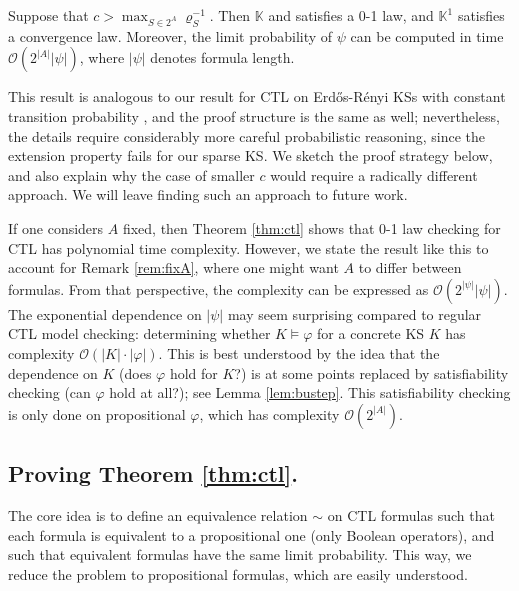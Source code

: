 \documentclass[runngingheads]{llncs}
\begin{document}
\begin{theorem} \label{thm:ctl}
Suppose that $c > \max_{S \in 2^A} \varrho_S^{-1}$. Then $\mathbb{K}$ and satisfies a 0-1 law, and $\mathbb{K}^1$ satisfies a convergence law. Moreover, the limit probability of $\psi$ can be computed in time $\mathcal{O}(2^{|A|}|\psi|)$, where $|\psi|$ denotes formula length.
\end{theorem}

This result is analogous to our result for CTL on Erd\H{o}s-Rényi KSs with constant transition probability \cite{dong20250}, and the proof structure is the same as well; nevertheless, the details require considerably more careful probabilistic reasoning, since the extension property fails for our sparse KS. We sketch the proof strategy below, and also explain why the case of smaller $c$ would require a radically different approach. We will leave finding such an approach to future work.

\begin{remark}
If one considers $A$ fixed, then Theorem \ref{thm:ctl} shows that 0-1 law checking for CTL has polynomial time complexity. However, we state the result like this to account for Remark \ref{rem:fixA}, where one might want $A$ to differ between formulas. From that perspective, the complexity can be expressed as $\mathcal{O}(2^{|\psi|}|\psi|)$. The exponential dependence on $|\psi|$ may seem surprising compared to regular CTL model checking: determining whether $K \models \varphi$ for a concrete KS $K$ has complexity $\mathcal{O}(|K|\cdot|\varphi|)$. This is best understood by the idea that the dependence on $K$ (does $\varphi$ hold for $K$?) is at some points replaced by satisfiability checking (can $\varphi$ hold at all?); see Lemma \ref{lem:bustep}. This satisfiability checking is only done on propositional $\varphi$, which has complexity $\mathcal{O}(2^{|A|})$.
\end{remark}

\subsection{Proving Theorem \ref{thm:ctl}.}

The core idea is to define an equivalence relation $\sim$ on CTL formulas such that each formula is equivalent to a propositional one (only Boolean operators), and such that equivalent formulas have the same limit probability. This way, we reduce the problem to propositional formulas, which are easily understood.
\end{document}
